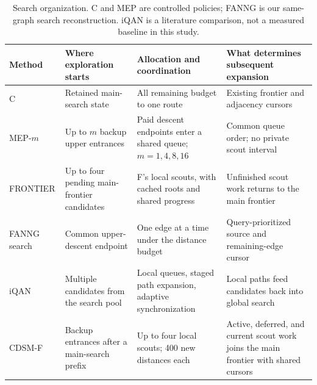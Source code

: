 \begin{table}[t]
\centering\small
\caption{Search organization. C and MEP are controlled policies; FANNG is our same-graph search reconstruction. iQAN is a literature comparison, not a measured baseline in this study.}
\label{tab:semantics}
\begin{tabularx}{\textwidth}{@{}lYYY@{}}
\toprule
Method & Where exploration starts & Allocation and coordination & What determines subsequent expansion \\
\midrule
C & Retained main-search state & All remaining budget to one route & Existing frontier and adjacency cursors \\
MEP-$m$ & Up to $m$ backup upper entrances & Paid descent endpoints enter a shared queue; $m=1,4,8,16$ & Common queue order; no private scout interval \\
FRONTIER & Up to four pending main-frontier candidates & F's local scouts, with cached roots and shared progress & Unfinished scout work returns to the main frontier \\
FANNG search & Common upper-descent endpoint & One edge at a time under the distance budget & Query-prioritized source and remaining-edge cursor \\
iQAN~\cite{iqan} & Multiple candidates from the search pool & Local queues, staged path expansion, adaptive synchronization & Local paths feed candidates back into global search \\
CDSM-F & Backup entrances after a main-search prefix & Up to four local scouts; 400 new distances each & Active, deferred, and current scout work joins the main frontier with shared cursors \\
\bottomrule
\end{tabularx}
\end{table}
